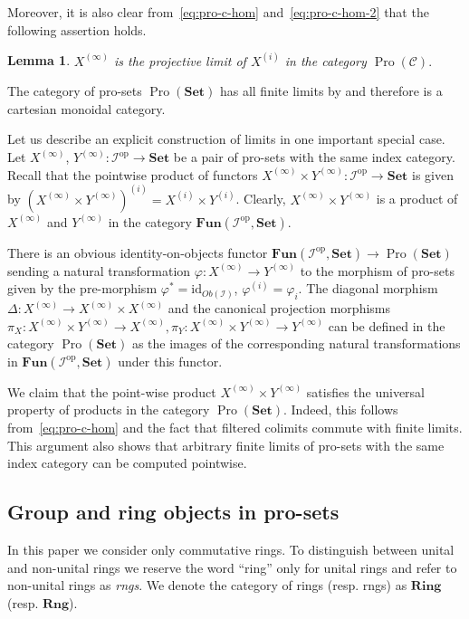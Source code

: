 \documentclass[oneside, 11pt]{amsart}
\numberwithin{equation}{section}
\newtheorem{lemma}{Lemma} \numberwithin{lemma}{section}
\theoremstyle{definition}
\theoremstyle{remark}
\DeclareMathOperator{\Pro}{Pro}
\newcommand{\Set}{\mathbf{Set}}
\newcommand{\Fun}{\mathbf{Fun}}
\newcommand{\op}{\mathrm{op}}
\begin{document}
Moreover, it is also clear from~\eqref{eq:pro-c-hom} and~\eqref{eq:pro-c-hom-2} that the following assertion holds.
\begin{lemma} \label{lem:proobj-is-a-limit}
  \(X^{(\infty)}\) is the projective limit of \(X^{(i)}\) in the category \(\Pro(\mathcal C).\)
\end{lemma}

The category of pro-sets \(\Pro(\Set)\) has all finite limits by \cite[Prop.~6.1.18]{SK06} and therefore is a cartesian monoidal category.

Let us describe an explicit construction of limits in one important special case. Let $X^{(\infty)}$, $Y^{(\infty)}\colon\mathcal{I}^{\op}\to\Set$ be a pair of pro-sets with the same index category. Recall that the pointwise product of functors $X^{(\infty)}\times Y^{(\infty)}\colon\mathcal{I}^{\op}\to\Set$ is given by $(X^{(\infty)} \times Y^{(\infty)})^{(i)} = X^{(i)} \times Y^{(i)}$. Clearly, $X^{(\infty)} \times Y^{(\infty)}$ is a product of $X^{(\infty)}$ and $Y^{(\infty)}$ in the category $\Fun(\mathcal{I}^{\op}, {\Set})$. 

There is an obvious identity-on-objects functor $\Fun(\mathcal{I}^\op, \Set) \to \Pro(\Set)$ sending a natural transformation $\varphi \colon X^{(\infty)} \to Y^{(\infty)}$ to the morphism of pro-sets given by the pre-morphism $\varphi^* = \mathrm{id}_{Ob(\mathcal{I})}$, $\varphi^{(i)} = \varphi_i$. The diagonal morphism $\Delta \colon X^{(\infty)} \to X^{(\infty)} \times X^{(\infty)}$ and the canonical projection morphisms \(\pi_X\colon X^{(\infty)} \times Y^{(\infty)} \to X^{(\infty)}, \pi_Y\colon X^{(\infty)} \times Y^{(\infty)} \to Y^{(\infty)}\) can be defined in the category $\Pro(\Set)$ as the images of the corresponding natural transformations in $\Fun(\mathcal{I}^\op, \Set)$ under this functor.

We claim that the point-wise product $X^{(\infty)} \times Y^{(\infty)}$ satisfies the universal property of products in the category $\Pro(\Set)$. Indeed, this follows from~\eqref{eq:pro-c-hom} and the fact that filtered colimits commute with finite limits. This argument also shows that arbitrary finite limits of pro-sets with the same index category can be computed pointwise.

\subsection{Group and ring objects in pro-sets}
In this paper we consider only commutative rings.
To distinguish between unital and non-unital rings we reserve the word ``ring'' only for unital rings and refer to non-unital rings as {\it rngs}.
We denote the category of rings (resp. rngs) as $\textbf{Ring}$ (resp. $\textbf{Rng}$).
\end{document}
